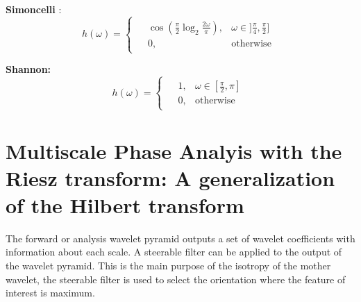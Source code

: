 \documentclass{InsightArticle}
\theoremstyle{definition}
\begin{document}
\noindent\begin{minipage}[t]{0.49\textwidth}
  \textbf{Simoncelli} \cite{portilla_image_2000, simoncelli_steerable_1995} :
\begin{equation*}
\label{Simoncelli}
  h(\omega) =
    \begin{cases}
    \begin{aligned}
  &\cos\left(\frac{\pi}{2} \log_2\frac{2\omega}{\pi}\right) , &\omega \in ]\frac{\pi}{4} , \frac{\pi}{2} ] \\
  &0, &\text{otherwise}
    \end{aligned}
    \end{cases}
\end{equation*}
\end{minipage}
\noindent\begin{minipage}[t]{0.49\textwidth}
\textbf{Shannon:}
\begin{equation*}
\label{Shannon}
  h(\omega) =
    \begin{cases}
    \begin{aligned}
  &1, &\omega \in [\frac{\pi}{2} , \pi ] \\
  &0, &\text{otherwise}
    \end{aligned}
    \end{cases}
\end{equation*}
\end{minipage}
%

\section{Multiscale Phase Analyis with the Riesz transform: A generalization of the Hilbert transform}
\label{sec:Riesz}
The forward or analysis wavelet pyramid outputs a set of wavelet coefficients with information about each scale.
A steerable filter \cite{held_steerable_2010, unser_steerable_2011, simoncelli_steerable_1995} can be applied to the output of the wavelet pyramid. This is the main purpose of the isotropy of the mother wavelet, the steerable filter is used to select the orientation where the feature of interest is maximum.
\end{document}
